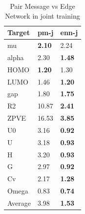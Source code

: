 \documentclass{article}
\begin{document}
\begin{table}[t]
\centering
\caption{Pair Message vs Edge Network in joint training}
\label{tb:pm2}
\begin{tabular}{lll}
\hline
Target & pm-j & enn-j \\
\hline

mu & \textbf{2.10}     & 2.24      \\
alpha & 2.30     & \textbf{1.48}      \\
HOMO & \textbf{1.20}     & 1.30      \\
LUMO & 1.46     & \textbf{1.20}      \\
gap & 1.80     & \textbf{1.75}      \\
R2 & 10.87    & \textbf{2.41}      \\
ZPVE & 16.53    & \textbf{3.85}      \\
U0 & 3.16     & \textbf{0.92}      \\
U & 3.18     & \textbf{0.93}      \\
H & 3.20     & \textbf{0.93}      \\
G & 2.97     & \textbf{0.92}      \\
Cv & 2.17     & \textbf{1.28}      \\
Omega & 0.83     & \textbf{0.74}      \\
\hline
Average & 3.98 & \textbf{1.53} 
\end{tabular}
\end{table}
\end{document}
